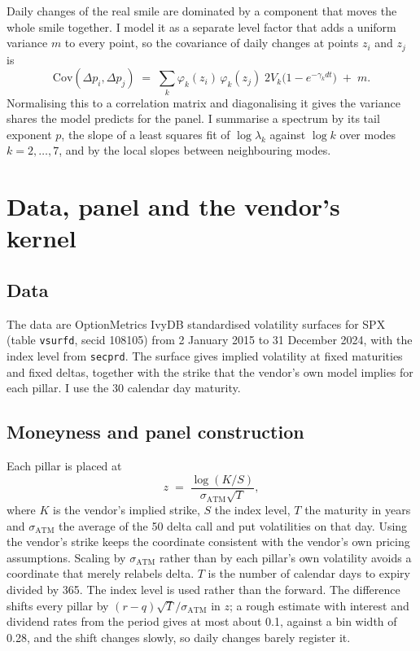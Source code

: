 \documentclass[11pt]{article}
\begin{document}
Daily changes of the real smile are dominated by a component that moves the whole smile together. I model it as a separate level factor that adds a uniform variance $m$ to every point, so the covariance of daily changes at points $z_i$ and $z_j$ is
\begin{equation}
\mathrm{Cov}(\Delta p_i,\Delta p_j) \;=\; \sum_{k} \varphi_k(z_i)\,\varphi_k(z_j)\; 2V_k\big(1-e^{-\gamma_k dt}\big)\;+\;m .
\label{eq:forward}
\end{equation}
Normalising this to a correlation matrix and diagonalising it gives the variance shares the model predicts for the panel. I summarise a spectrum by its tail exponent $p$, the slope of a least squares fit of $\log\lambda_k$ against $\log k$ over modes $k=2,\dots,7$, and by the local slopes between neighbouring modes.

\section{Data, panel and the vendor's kernel}
\label{sec:data}

\subsection{Data}

The data are OptionMetrics IvyDB standardised volatility surfaces for SPX (table \texttt{vsurfd}, secid 108105) from 2 January 2015 to 31 December 2024, with the index level from \texttt{secprd}. The surface gives implied volatility at fixed maturities and fixed deltas, together with the strike that the vendor's own model implies for each pillar. I use the 30 calendar day maturity.

\subsection{Moneyness and panel construction}

Each pillar is placed at
\begin{equation}
z \;=\; \frac{\log(K/S)}{\sigma_{\mathrm{ATM}}\sqrt{T}},
\end{equation}
where $K$ is the vendor's implied strike, $S$ the index level, $T$ the maturity in years and $\sigma_{\mathrm{ATM}}$ the average of the 50 delta call and put volatilities on that day. Using the vendor's strike keeps the coordinate consistent with the vendor's own pricing assumptions. Scaling by $\sigma_{\mathrm{ATM}}$ rather than by each pillar's own volatility avoids a coordinate that merely relabels delta. $T$ is the number of calendar days to expiry divided by 365. The index level is used rather than the forward. The difference shifts every pillar by $(r-q)\sqrt{T}/\sigma_{\mathrm{ATM}}$ in $z$; a rough estimate with interest and dividend rates from the period gives at most about 0.1, against a bin width of 0.28, and the shift changes slowly, so daily changes barely register it.
\end{document}
